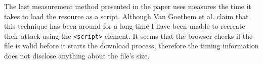 \documentclass[10pt,a4paper,twoside]{book}
\begin{document}
The last measurement method presented in the paper uses measures the time it takes to load the resource as a script. Although Van Goethem et al. \cite{van2015clock} claim that this technique has been around for a long time I have been unable to recreate their attack using the \texttt{<script>} element. It seems that the browser checks if the file is valid before it starts the download process, therefore the timing information does not disclose anything about the file's size.







\cleardoublepage
\pagestyle{marked}



\end{document}
